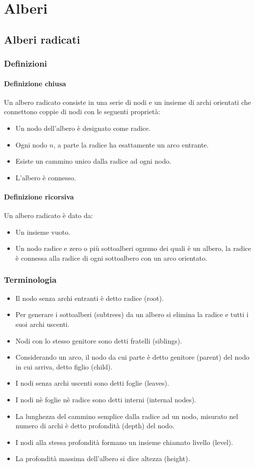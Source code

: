 \chapter{Alberi}
\section{Alberi radicati}
\subsection{Definizioni}
\subsubsection{Definizione chiusa}
Un albero radicato consiste in una serie di nodi e un insieme di archi orientati che connettono coppie di nodi con le seguenti propriet\`a:
\begin{itemize}
\item Un nodo dell'albero \`e designato come radice.
\item Ogni nodo $n$, a parte la radice ha esattamente un arco entrante.
\item Esiste un cammino unico dalla radice ad ogni nodo.
\item L'albero \`e connesso.
\end{itemize}
\subsubsection{Definizione ricorsiva}
Un albero radicato \`e dato da:
\begin{itemize}
\item Un insieme vuoto.
\item Un nodo radice e zero o pi\`u sottoalberi ognuno dei quali \`e un albero, la radice \`e connessa alla radice di ogni sottoalbero con un arco orientato.
\end{itemize}
\subsection{Terminologia}
\begin{itemize}
\item Il nodo senza archi entranti \`e detto radice (root).
\item Per generare i sottoalberi (subtrees) da un albero si elimina la radice e tutti i suoi archi uscenti.
\item Nodi con lo stesso genitore sono detti fratelli (siblings).
\item Considerando un arco, il nodo da cui parte \`e detto genitore (parent) del nodo in cui arriva, detto figlio (child).
\item I nodi senza archi uscenti sono detti foglie (leaves).
\item I nodi n\`e foglie n\`e radice sono detti interni (internal nodes).
\item La lunghezza del cammino semplice dalla radice ad un nodo, misurato nel numero di archi \`e detto profondit\`a (depth) del nodo.
\item I nodi alla stessa profondit\`a formano un insieme chiamato livello (level).
\item La profondit\`a massima dell'albero si dice altezza (height).
\end{itemize}
